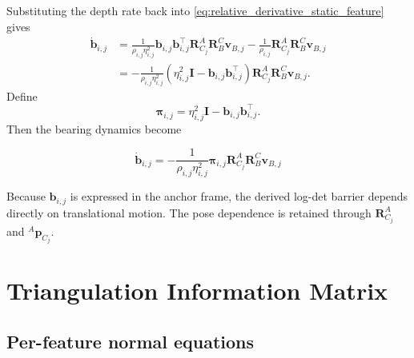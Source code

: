 \documentclass[11pt,a4paper]{article}
\begin{document}
Substituting the depth rate back into
\eqref{eq:relative_derivative_static_feature} gives
\begin{align}
  \dot{\bm{b}}_{i,j}
  &= \frac{1}{\rho_{i,j}\eta_{i,j}^{2}}
     \bm{b}_{i,j}\bm{b}_{i,j}^{\top}
     \bm{R}_{C_j}^{A}\bm{R}_{B}^{C}\bm{v}_{B,j}
     -\frac{1}{\rho_{i,j}}\bm{R}_{C_j}^{A}\bm{R}_{B}^{C}\bm{v}_{B,j} \\
  &= -\frac{1}{\rho_{i,j}\eta_{i,j}^{2}}
     \left(\eta_{i,j}^{2}\bm{I}
     -\bm{b}_{i,j}\bm{b}_{i,j}^{\top}\right)
     \bm{R}_{C_j}^{A}\bm{R}_{B}^{C}\bm{v}_{B,j}.
\end{align}
Define
\begin{equation}
  \bm{\pi}_{i,j}
  = \eta_{i,j}^{2}\bm{I}
    -\bm{b}_{i,j}\bm{b}_{i,j}^{\top}.
  \label{eq:pij_def}
\end{equation}
Then the bearing dynamics become
\begin{keyresult}
\begin{equation}
  \boxed{
  \dot{\bm{b}}_{i,j}
  = -\frac{1}{\rho_{i,j}\eta_{i,j}^{2}}
  \bm{\pi}_{i,j}\bm{R}_{C_j}^{A}\bm{R}_{B}^{C}\bm{v}_{B,j}}
  \label{eq:bdot_multi_feature}
\end{equation}
\end{keyresult}

\begin{remark}
Because $\bm{b}_{i,j}$ is expressed in the anchor frame, the derived log-det
barrier depends directly on translational motion.  The pose dependence is
retained through $\bm{R}_{C_j}^{A}$ and ${}^{A}\bm{p}_{C_j}$.
\end{remark}

\section{Triangulation Information Matrix}

\subsection{Per-feature normal equations}
\end{document}
